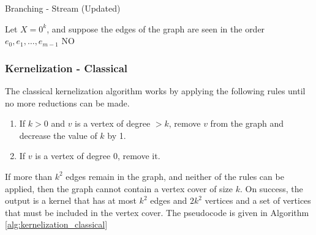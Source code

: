 \begin{algorithm}[htb]
    \caption{Branching - Stream (Updated)}
    \label{alg:branching_stream}
    \DontPrintSemicolon


    Let $X = 0^k$, and suppose the edges of the graph are seen in the order $e_0, e_1, \dots, e_{m-1}$\;
    \Return NO
\end{algorithm}

\subsubsection{Kernelization - Classical}

The classical kernelization algorithm works by applying the following rules
until no more reductions can be made.

\begin{enumerate}
    \item
          If \(k > 0\) and \(v\) is a vertex of degree \(> k\), remove \(v\)
          from the graph and decrease the value of \(k\) by 1.
    \item
          If \(v\) is a vertex of degree 0, remove it.
\end{enumerate}

If more than \(k^2\) edges remain in the graph, and neither of the rules can be
applied, then the graph cannot contain a vertex cover of size \(k\). On
success, the output is a kernel that has at most \(k^2\) edges and \(2k^2\)
vertices and a set of vertices that must be included in the vertex cover. The
pseudocode is given in Algorithm \ref{alg:kernelization_classical}

